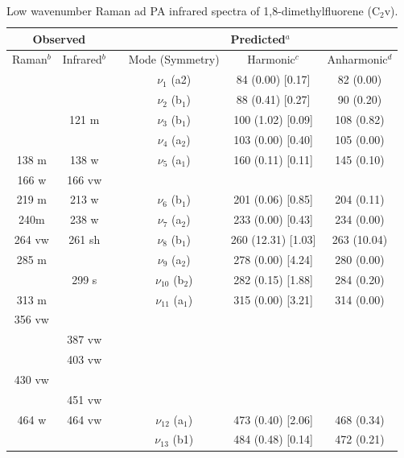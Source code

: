 \begin{table}[H]
	\caption{Low wavenumber Raman ad PA infrared spectra of 1,8-dimethylfluorene (C$_{2}$v).}
	\begin{center}
		\begin{threeparttable}
		\begin{tabular}{c c c c c c}
			\hline
			\multicolumn{ 2}{c}{Observed} & \multicolumn{1}{c}{} & \multicolumn{ 3}{c}{Predicted$^{a}$} \\ \hline
			Raman$^{b}$ & \multicolumn{1}{c}{Infrared$^{b}$} &  & \multicolumn{1}{c}{Mode (Symmetry)} & \multicolumn{1}{c}{Harmonic$^{c}$} & Anharmonic$^{d}$ \\ \hline
\multicolumn{1}{c}{} &  &  & $\nu_{1}$ (a2) & 84 (0.00) [0.17] & 82 (0.00) \\ 
&  &  & $\nu_{2}$ (b$_{1}$) & 88 (0.41) [0.27] & 90 (0.20) \\ 
& 121 m &  & $\nu_{3}$ (b$_{1}$) & 100 (1.02) [0.09] & 108 (0.82) \\ 
&  &  & $\nu_{4}$ (a$_{2}$) & 103 (0.00) [0.40] & 105 (0.00) \\ 
138 m & 138 w &  & $\nu_{5}$ (a$_{1}$) & 160 (0.11) [0.11] & 145 (0.10) \\ 
166 w & 166 vw &  &  &  &  \\ 
219 m & 213 w &  & $\nu_{6}$ (b$_{1}$) & 201 (0.06) [0.85] & 204 (0.11) \\ 
240m & 238 w &  & $\nu_{7}$ (a$_{2}$) & 233 (0.00) [0.43] & 234 (0.00) \\ 
264 vw & 261 sh &  & $\nu_{8}$ (b$_{1}$) & 260 (12.31) [1.03] & 263 (10.04) \\ 
285 m &  &  & $\nu_{9}$ (a$_{2}$) & 278 (0.00) [4.24] & 280 (0.00) \\ 
& 299 s &  & $\nu_{10}$ (b$_{2}$)
& 282 (0.15) [1.88] & 284 (0.20) \\ 
313 m &  &  & $\nu_{11}$ (a$_{1}$) & 315 (0.00) [3.21] & 314 (0.00) \\ 
356 vw &  &  &  &  &  \\ 
& 387 vw &  &  &  &  \\ 
& 403 vw &  &  &  & \multicolumn{1}{l}{} \\ 
430 vw &  &  & \multicolumn{1}{c}{} &  &  \\ 
& 451 vw &  &  &  & \multicolumn{1}{l}{} \\ 
464 w & 464 vw &  & $\nu_{12}$ (a$_{1}$) & 473 (0.40) [2.06] & 468 (0.34) \\ 
&  &  & $\nu_{13}$ (b1) & 484 (0.48) [0.14] & 472 (0.21) \\ 

\end{tabular}
\end{threeparttable}
\end{center}
\end{table}
